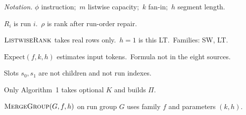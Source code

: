 \DontPrintSemicolon
\newcommand{\Rank}{\mbox{\textsc{ListwiseRank}}}
\newcommand{\MergeGroup}{\mbox{\textsc{MergeGroup}}}
\newcommand{\Expect}{\mathrm{Expect}}

{\raggedright{}
\noindent\textit{Notation.}\quad
$\phi$ instruction;\ $m$ listwise capacity;\ $k$ fan-in;\ $h$ segment length.\par
\noindent $R_i$ is run $i$.\ $\rho$ is rank after run-order repair.\par
\noindent $\Rank$ takes real rows only.\ $h{=}1$ is this LT.\ Families: SW, LT.\par
\noindent $\Expect(f,k,h)$ estimates input tokens.\ Formula not in the eight sources.\par
\noindent Slots $s_0,s_1$ are not children and not run indexes.\par
\noindent Only Algorithm~1 takes optional $K$ and builds $\Pi$.\par
\noindent $\MergeGroup(G,f,h)$ on run group $G$ uses family $f$ and parameters $(k,h)$.\par
}
